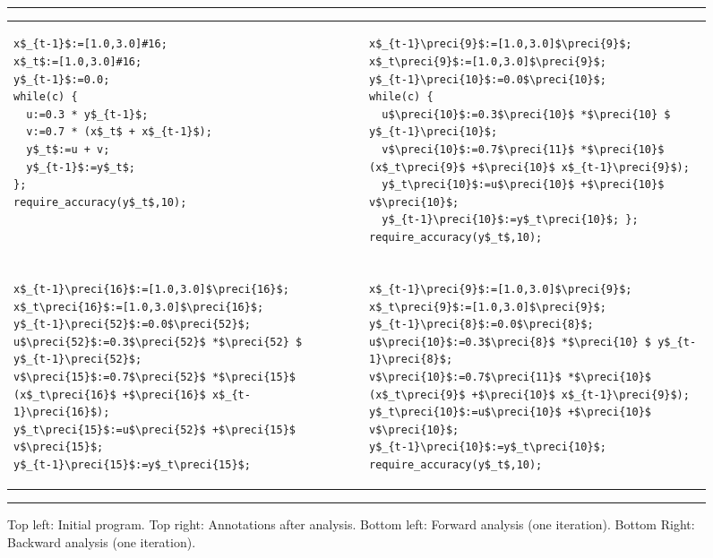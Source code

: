 \begin{figure}[t]
\begin{center}\tt\scriptsize
\hrule
\vspace{0.2cm}
\begin{tabular}{lll}
\begin{lstlisting}[mathescape]
x$_{t-1}$:=[1.0,3.0]#16;
x$_t$:=[1.0,3.0]#16;
y$_{t-1}$:=0.0;
while(c) {
  u:=0.3 * y$_{t-1}$; 
  v:=0.7 * (x$_t$ + x$_{t-1}$);
  y$_t$:=u + v;
  y$_{t-1}$:=y$_t$;
};
require_accuracy(y$_t$,10);
  \end{lstlisting}
& &


  \begin{lstlisting}[mathescape]
x$_{t-1}\preci{9}$:=[1.0,3.0]$\preci{9}$; x$_t\preci{9}$:=[1.0,3.0]$\preci{9}$;
y$_{t-1}\preci{10}$:=0.0$\preci{10}$;
while(c) {
  u$\preci{10}$:=0.3$\preci{10}$ *$\preci{10} $ y$_{t-1}\preci{10}$; 
  v$\preci{10}$:=0.7$\preci{11}$ *$\preci{10}$ (x$_t\preci{9}$ +$\preci{10}$ x$_{t-1}\preci{9}$);
  y$_t\preci{10}$:=u$\preci{10}$ +$\preci{10}$ v$\preci{10}$;
  y$_{t-1}\preci{10}$:=y$_t\preci{10}$; };
require_accuracy(y$_t$,10);
  \end{lstlisting}
\\
&&
\\

  \begin{lstlisting}[mathescape]
x$_{t-1}\preci{16}$:=[1.0,3.0]$\preci{16}$;
x$_t\preci{16}$:=[1.0,3.0]$\preci{16}$;
y$_{t-1}\preci{52}$:=0.0$\preci{52}$;
u$\preci{52}$:=0.3$\preci{52}$ *$\preci{52} $ y$_{t-1}\preci{52}$; 
v$\preci{15}$:=0.7$\preci{52}$ *$\preci{15}$ (x$_t\preci{16}$ +$\preci{16}$ x$_{t-1}\preci{16}$);
y$_t\preci{15}$:=u$\preci{52}$ +$\preci{15}$ v$\preci{15}$;
y$_{t-1}\preci{15}$:=y$_t\preci{15}$;
  \end{lstlisting}
&&

  \begin{lstlisting}[mathescape]
x$_{t-1}\preci{9}$:=[1.0,3.0]$\preci{9}$; x$_t\preci{9}$:=[1.0,3.0]$\preci{9}$;
y$_{t-1}\preci{8}$:=0.0$\preci{8}$;
u$\preci{10}$:=0.3$\preci{8}$ *$\preci{10} $ y$_{t-1}\preci{8}$; 
v$\preci{10}$:=0.7$\preci{11}$ *$\preci{10}$ (x$_t\preci{9}$ +$\preci{10}$ x$_{t-1}\preci{9}$);
y$_t\preci{10}$:=u$\preci{10}$ +$\preci{10}$ v$\preci{10}$;
y$_{t-1}\preci{10}$:=y$_t\preci{10}$;
require_accuracy(y$_t$,10);
  \end{lstlisting}
\end{tabular}
\vspace{0.2cm}
\hrule
\end{center}
\caption{\label{figrun}
Top left: Initial  program. Top right: Annotations after analysis.
Bottom left: Forward analysis (one iteration). Bottom Right: Backward analysis (one iteration). 
} 
\end{figure}

